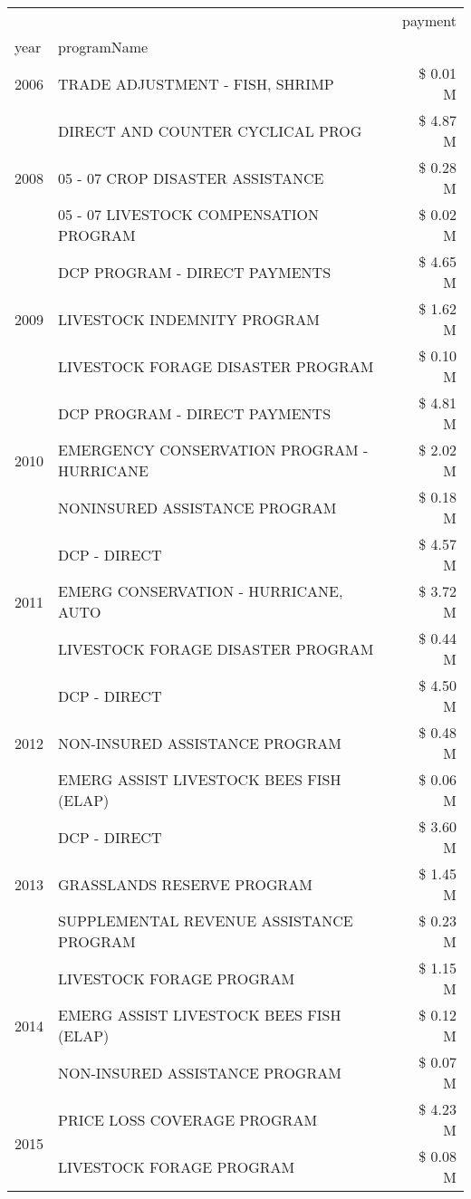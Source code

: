 \begin{tabular}{llr}
\toprule
 &  & payment \\
year & programName &  \\
\midrule
2006 & TRADE ADJUSTMENT - FISH, SHRIMP & \$ 0.01 M \\
\cline{1-3}
\multirow[t]{3}{*}{2008} & DIRECT AND COUNTER CYCLICAL PROG & \$ 4.87 M \\
 & 05 - 07 CROP DISASTER ASSISTANCE & \$ 0.28 M \\
 & 05 - 07 LIVESTOCK COMPENSATION PROGRAM & \$ 0.02 M \\
\cline{1-3}
\multirow[t]{3}{*}{2009} & DCP PROGRAM - DIRECT PAYMENTS & \$ 4.65 M \\
 & LIVESTOCK INDEMNITY PROGRAM & \$ 1.62 M \\
 & LIVESTOCK FORAGE DISASTER  PROGRAM & \$ 0.10 M \\
\cline{1-3}
\multirow[t]{3}{*}{2010} & DCP PROGRAM - DIRECT PAYMENTS & \$ 4.81 M \\
 & EMERGENCY CONSERVATION PROGRAM - HURRICANE & \$ 2.02 M \\
 & NONINSURED ASSISTANCE PROGRAM & \$ 0.18 M \\
\cline{1-3}
\multirow[t]{3}{*}{2011} & DCP - DIRECT & \$ 4.57 M \\
 & EMERG CONSERVATION - HURRICANE, AUTO & \$ 3.72 M \\
 & LIVESTOCK FORAGE DISASTER PROGRAM & \$ 0.44 M \\
\cline{1-3}
\multirow[t]{3}{*}{2012} & DCP - DIRECT & \$ 4.50 M \\
 & NON-INSURED ASSISTANCE PROGRAM & \$ 0.48 M \\
 & EMERG ASSIST LIVESTOCK BEES FISH (ELAP) & \$ 0.06 M \\
\cline{1-3}
\multirow[t]{3}{*}{2013} & DCP - DIRECT & \$ 3.60 M \\
 & GRASSLANDS RESERVE PROGRAM & \$ 1.45 M \\
 & SUPPLEMENTAL REVENUE ASSISTANCE PROGRAM & \$ 0.23 M \\
\cline{1-3}
\multirow[t]{3}{*}{2014} & LIVESTOCK FORAGE PROGRAM & \$ 1.15 M \\
 & EMERG ASSIST LIVESTOCK BEES FISH (ELAP) & \$ 0.12 M \\
 & NON-INSURED ASSISTANCE PROGRAM & \$ 0.07 M \\
\cline{1-3}
\multirow[t]{3}{*}{2015} & PRICE LOSS COVERAGE PROGRAM & \$ 4.23 M \\
 & LIVESTOCK FORAGE PROGRAM & \$ 0.08 M \\

\end{tabular}

